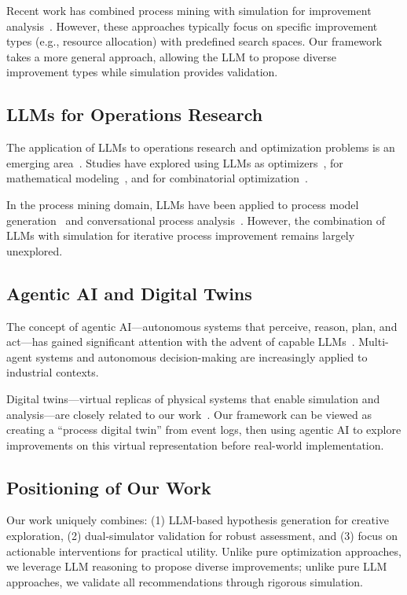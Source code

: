 \documentclass[preprint,12pt]{elsarticle}
\begin{document}
Recent work has combined process mining with simulation for improvement analysis~\cite{martin2016recommendations}. However, these approaches typically focus on specific improvement types (e.g., resource allocation) with predefined search spaces. Our framework takes a more general approach, allowing the LLM to propose diverse improvement types while simulation provides validation.

\subsection{LLMs for Operations Research}

The application of LLMs to operations research and optimization problems is an emerging area~\cite{ahmaditeshnizi2024optimus}. Studies have explored using LLMs as optimizers~\cite{yang2024large}, for mathematical modeling~\cite{li2024large}, and for combinatorial optimization~\cite{romera2024mathematical}.

In the process mining domain, LLMs have been applied to process model generation~\cite{berti2023abstractions} and conversational process analysis~\cite{grohs2024large}. However, the combination of LLMs with simulation for iterative process improvement remains largely unexplored.

\subsection{Agentic AI and Digital Twins}

The concept of agentic AI---autonomous systems that perceive, reason, plan, and act---has gained significant attention with the advent of capable LLMs~\cite{wang2024survey}. Multi-agent systems and autonomous decision-making are increasingly applied to industrial contexts.

Digital twins---virtual replicas of physical systems that enable simulation and analysis---are closely related to our work~\cite{tao2018digital}. Our framework can be viewed as creating a ``process digital twin'' from event logs, then using agentic AI to explore improvements on this virtual representation before real-world implementation.

\subsection{Positioning of Our Work}

Our work uniquely combines: (1) LLM-based hypothesis generation for creative exploration, (2) dual-simulator validation for robust assessment, and (3) focus on actionable interventions for practical utility. Unlike pure optimization approaches, we leverage LLM reasoning to propose diverse improvements; unlike pure LLM approaches, we validate all recommendations through rigorous simulation.
\end{document}
